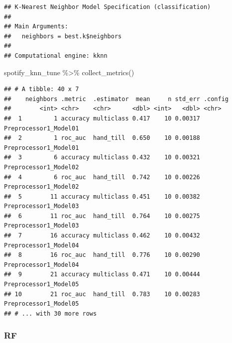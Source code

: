 \documentclass[
]{article}
\newenvironment{Shaded}{\begin{snugshade}}{\end{snugshade}}
\newcommand{\FunctionTok}[1]{\textcolor[rgb]{0.00,0.00,0.00}{#1}}
\newcommand{\NormalTok}[1]{#1}
\newcommand{\SpecialCharTok}[1]{\textcolor[rgb]{0.00,0.00,0.00}{#1}}
\begin{document}
\begin{verbatim}
## K-Nearest Neighbor Model Specification (classification)
## 
## Main Arguments:
##   neighbors = best.k$neighbors
## 
## Computational engine: kknn
\end{verbatim}

\begin{Shaded}
\begin{Highlighting}[]
\NormalTok{spotify\_knn\_tune }\SpecialCharTok{\%\textgreater{}\%} \FunctionTok{collect\_metrics}\NormalTok{()}
\end{Highlighting}
\end{Shaded}

\begin{verbatim}
## # A tibble: 40 x 7
##    neighbors .metric  .estimator  mean     n std_err .config              
##        <int> <chr>    <chr>      <dbl> <int>   <dbl> <chr>                
##  1         1 accuracy multiclass 0.417    10 0.00317 Preprocessor1_Model01
##  2         1 roc_auc  hand_till  0.650    10 0.00188 Preprocessor1_Model01
##  3         6 accuracy multiclass 0.432    10 0.00321 Preprocessor1_Model02
##  4         6 roc_auc  hand_till  0.742    10 0.00226 Preprocessor1_Model02
##  5        11 accuracy multiclass 0.451    10 0.00382 Preprocessor1_Model03
##  6        11 roc_auc  hand_till  0.764    10 0.00275 Preprocessor1_Model03
##  7        16 accuracy multiclass 0.462    10 0.00432 Preprocessor1_Model04
##  8        16 roc_auc  hand_till  0.776    10 0.00290 Preprocessor1_Model04
##  9        21 accuracy multiclass 0.471    10 0.00444 Preprocessor1_Model05
## 10        21 roc_auc  hand_till  0.783    10 0.00283 Preprocessor1_Model05
## # ... with 30 more rows
\end{verbatim}

\hypertarget{rf}{%
\subsubsection{RF}\label{rf}}
\end{document}
